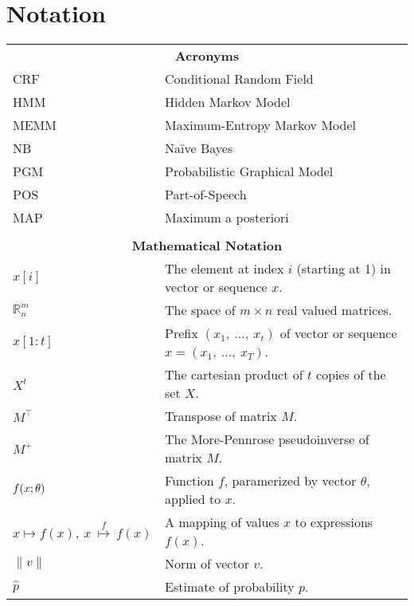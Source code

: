 \documentclass[officiallayout,final]{unihelcompling}
\newcommand{\R}{\mbox{$\mathbb R$}}
\newcommand{\parcond}{\mbox{$ ; \, $}}
\renewcommand{\:}{\mbox{${\rm :}$}}
\begin{document}
\chapter*{Notation}
\begin{tabular*}{\columnwidth}{@{\extracolsep{\stretch{1}}}*{2}{l}@{}}
\multicolumn{2}{c}{{\bf Acronyms}}\\
CRF  & Conditional Random Field                          \\
HMM  & Hidden Markov Model                               \\
MEMM & Maximum-Entropy Markov Model                      \\
NB   & Na\"{i}ve Bayes                                   \\
PGM  & Probabilistic Graphical Model                     \\
POS  & Part-of-Speech                                    \\
MAP  & Maximum a posteriori                              \\
     & \\
\multicolumn{2}{c}{{\bf Mathematical Notation}}\\
$x[i]$ & The element at index $i$ (starting at 1) in vector or sequence $x$.\\
$\R^m_n$ & The space of $m \times n$ real valued matrices.\\
$x[1:t]$ & Prefix $(x_1,\ ...,\ x_t)$ of vector or sequence $x = (x_1,\ ...,\ x_T)$.\\
$X^t$    & The cartesian product of $t$ copies of the set $X$.\\
$M^\top$ & Transpose of matrix $M$.\\
$M^+$    & The More-Pennrose pseudoinverse of matrix $M$.\\ 
$f(x\parcond\theta)$ & Function $f$, paramerized by vector $\theta$, applied to $x$.\\
$x \mapsto f(x),\ x \overset{f}{\ \mapsto\ } f(x)$ & A mapping of values $x$ to expressions $f(x)$.\\
$\|v\|$ & Norm of vector $v$.\\
$\hat{p}$ & Estimate of probability $p$.
\end{tabular*}










\end{document}
